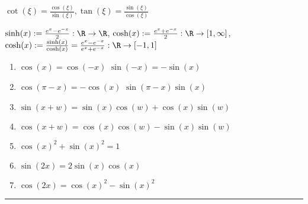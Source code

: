 \begin{multicols}{2}
    $\cot(\xi) = \displaystyle\frac{\cos(\xi)}{\sin(\xi)}, \tan(\xi) = \frac{\sin(\xi)}{\cos(\xi)}$

    $\sinh(x) := \frac{e^x - e^{-x}}{2} : \R \rightarrow \R$,
    $\cosh(x) := \frac{e^x + e^{-x}}{2} : \R \rightarrow [1, \infty]$,
    $\cosh(x) := \frac{\sinh(x)}{\cosh(x)} = \frac{e^x - e^{-x}}{e^x + e^{-x}} : \R \rightarrow [-1, 1]$

    \begin{enumerate}
        \item $\cos(x) = \cos(-x)$ \trand $\sin(-x) = -\sin(x)$
        \item $\cos(\pi - x) = -\cos(x)$ \trand $\sin(\pi - x) \sin(x)$
        \item $\sin(x + w) = \sin(x) \cos(w) + \cos(x) \sin(w)$
        \item $\cos(x + w) = \cos(x) \cos(w) - \sin(x) \sin(w)$
        \item $\cos(x)^2 + \sin(x)^2 = 1$
        \item $\sin(2x) = 2 \sin(x) \cos(x)$
        \item $\cos(2x) = \cos(x)^2 - \sin(x)^2$
    \end{enumerate}
\end{multicols}

\hrule

